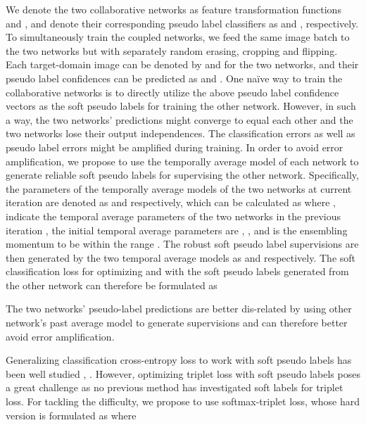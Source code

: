\documentclass{article} \usepackage{iclr2020_conference,times}
\begin{document}
We denote the two collaborative networks as feature transformation functions  and , and denote their corresponding pseudo label classifiers as  and , respectively. 
To simultaneously train the coupled networks, we feed the same image batch to the two networks but with separately random erasing, cropping and flipping. Each target-domain image can be denoted by  and  for the two networks, and their pseudo label confidences can be predicted as  and . 
One na\"ive way to train the collaborative networks is to directly utilize the above pseudo label confidence vectors as the soft pseudo labels for training the other network. However, in such a way, the two networks' predictions might converge to equal each other and the two networks lose their output independences. The classification errors as well as pseudo label errors might be amplified during training.
In order to avoid error amplification, we propose to use the temporally average model of each network to generate reliable soft pseudo labels for supervising the other network. Specifically, the parameters of the temporally average models of the two networks at current iteration  are denoted as  and  respectively, which can be calculated as
{\small
}where ,  indicate the temporal average parameters of the two networks in the previous iteration , the initial temporal average parameters are , , and  is the ensembling momentum to be within the range . The robust soft pseudo label supervisions are then generated by the two temporal average models as  and  respectively. The soft classification loss for optimizing  and  with the soft pseudo labels generated from the other network can therefore be formulated as
{\small
}

The two networks' pseudo-label predictions 
are better dis-related by using other network's past average model to generate supervisions and can therefore better avoid error amplification.


Generalizing classification cross-entropy loss to work with soft pseudo labels has been well studied \citep{hinton2015distilling}, \citep{muller2019does}. However, optimizing triplet loss with soft pseudo labels poses a great challenge as no previous method has investigated soft labels for triplet loss. For tackling the difficulty, we propose to use softmax-triplet loss, whose hard version is formulated as
{\small
}where 
{ \small
}
\end{document}
